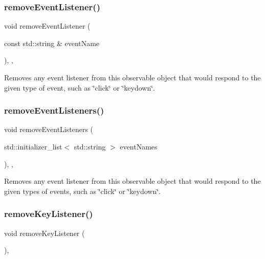 \subsubsection{\texorpdfstring{remove\+Event\+Listener()}{removeEventListener()}}
{\footnotesize\ttfamily void remove\+Event\+Listener (\begin{DoxyParamCaption}\item[{const std\+::string \&}]{event\+Name }\end{DoxyParamCaption})\hspace{0.3cm}{\ttfamily [protected]}, {\ttfamily [virtual]}, {\ttfamily [inherited]}}



Removes any event listener from this observable object that would respond to the given type of event, such as \char`\"{}click\char`\"{} or \char`\"{}keydown\char`\"{}. 

\mbox{\label{classsgl_1_1GObservable_af51cc35c29a1bd1908609d432decdbb6}} 
\subsubsection{\texorpdfstring{remove\+Event\+Listeners()}{removeEventListeners()}}
{\footnotesize\ttfamily void remove\+Event\+Listeners (\begin{DoxyParamCaption}\item[{std\+::initializer\+\_\+list$<$ std\+::string $>$}]{event\+Names }\end{DoxyParamCaption})\hspace{0.3cm}{\ttfamily [protected]}, {\ttfamily [virtual]}, {\ttfamily [inherited]}}



Removes any event listener from this observable object that would respond to the given types of events, such as \char`\"{}click\char`\"{} or \char`\"{}keydown\char`\"{}. 

\mbox{\label{classsgl_1_1GInteractor_a43095f41cab3be732b49f29970484b05}} 
\subsubsection{\texorpdfstring{remove\+Key\+Listener()}{removeKeyListener()}}
{\footnotesize\ttfamily void remove\+Key\+Listener (\begin{DoxyParamCaption}{ }\end{DoxyParamCaption})\hspace{0.3cm}{\ttfamily [virtual]}, {\ttfamily [inherited]}}



